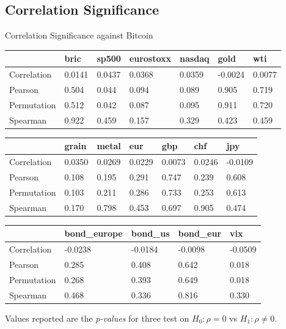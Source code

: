 \documentclass{beamer}
\newcommand\SmallerFont{\fontsize{8}{10}\selectfont}
\begin{document}
\subsection{Correlation Significance}

%

\begin{frame}{Correlation Significance against Bitcoin}
\SmallerFont
\begin{table}[]
\begin{tabular}{lllllll}
\toprule
 & bric & sp500 & eurostoxx & nasdaq & gold & wti \\
\midrule
Correlation & 0.0141 & 0.0437 & 0.0368 & 0.0359 & -0.0024 & 0.0077 \\
Pearson & 0.504 & 0.044 & 0.094 & 0.089 & 0.905 & 0.719 \\
Permutation & 0.512 & 0.042 & 0.087 & 0.095 & 0.911 & 0.720 \\
Spearman & 0.922 & 0.459 & 0.157 & 0.329 & 0.423 & 0.459 \\
\bottomrule
\end{tabular}

\end{table}

\begin{table}[]
\begin{tabular}{lllllll}
\toprule
 & grain & metal & eur & gbp & chf & jpy \\
\midrule
Correlation & 0.0350 & 0.0269 & 0.0229 & 0.0073 & 0.0246 & -0.0109 \\
Pearson & 0.108 & 0.195 & 0.291 & 0.747 & 0.239 & 0.608 \\
Permutation & 0.103 & 0.211 & 0.286 & 0.733 & 0.253 & 0.613 \\
Spearman & 0.170 & 0.798 & 0.453 & 0.697 & 0.905 & 0.474 \\
\bottomrule
\end{tabular}

\end{table}

\begin{table}[]
\begin{tabular}{lllll}

\toprule
 & bond\_europe & bond\_us & bond\_eur & vix \\
\midrule
Correlation & -0.0238 & -0.0184 & -0.0098 & -0.0509 \\
Pearson & 0.285 & 0.408 & 0.642 & 0.018 \\
Permutation & 0.268 & 0.393 & 0.649 & 0.018 \\
Spearman & 0.468 & 0.336 & 0.816 & 0.330 \\
\bottomrule
\end{tabular}
\end{table}

Values reported are the \textit{p-values} for three test on $H_0: \rho=0$ vs $H_1: \rho \neq 0$.
\end{frame}
\end{document}
